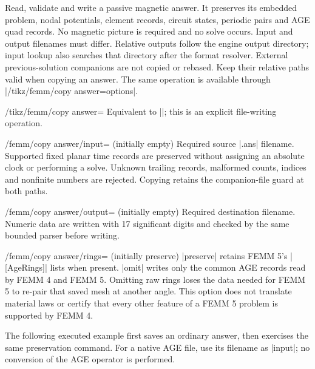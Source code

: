 \begin{command}{\femmcopyanswer{}}
Read, validate and write a passive magnetic answer. It preserves its embedded
problem, nodal potentials, element records, circuit states, periodic pairs and
AGE quad records. No magnetic picture is required and no solve occurs. Input
and output filenames must differ. Relative outputs follow the engine output
directory; input lookup also searches that directory after the format resolver.
External previous-solution companions are not copied or rebased. Keep their
relative paths valid when copying an answer. The same operation is available through
|/tikz/femm/copy answer={options}|.
\end{command}
\begin{key}{/tikz/femm/copy answer=}
Equivalent to |\femmcopyanswer|; this is an explicit file-writing operation.
\end{key}
\begin{key}{/femm/copy answer/input= (initially empty)}
Required source |.ans| filename. Supported fixed planar time records are
preserved without assigning an absolute clock or performing a solve. Unknown
trailing records, malformed counts, indices and nonfinite numbers are rejected.
Copying retains the companion-file guard at both paths.
\end{key}
\begin{key}{/femm/copy answer/output= (initially empty)}
Required destination filename. Numeric data are written with 17 significant
digits and checked by the same bounded parser before writing.
\end{key}
\begin{key}{/femm/copy answer/rings= (initially preserve)}
|preserve| retains FEMM 5's |[AgeRings]| lists when present. |omit| writes only the
common AGE records read by FEMM 4 and FEMM 5. Omitting raw rings loses the data
needed for FEMM 5 to re-pair that saved mesh at another angle. This option does
not translate material laws or certify that every other feature of a FEMM 5
problem is supported by FEMM 4.
\end{key}

The following executed example first saves an ordinary answer, then exercises
the same preservation command. For a native AGE file, use its filename as
|input|; no conversion of the AGE operator is performed.
\begin{codeexample}[]
\femmcopyanswer[input=\jobname-source.ans,output=\jobname-copy.ans]
\end{codeexample}
